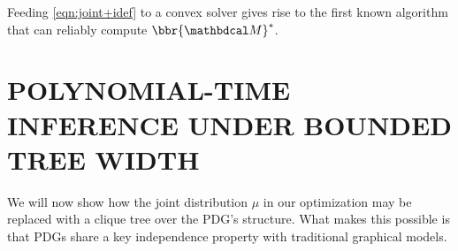 \documentclass[twoside]{article}
\begin{document}
Feeding \eqref{eqn:joint+idef} to a convex solver gives rise to the first known algorithm
that can reliably compute $\bbr{\dg M}^*$.





\section{POLYNOMIAL-TIME INFERENCE UNDER BOUNDED TREE WIDTH}
    \label{sec:clique-tree-expcone}

We will now show how the joint distribution $\mu$ in our optimization may be replaced
with a clique tree over the PDG's structure. What makes this possible is that
PDGs share a key independence property with traditional graphical models. 
\end{document}

